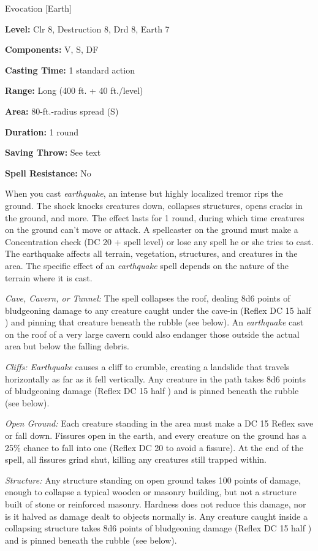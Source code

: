 
Evocation [Earth]

\textbf{Level:} Clr 8, Destruction 8, Drd 8, Earth 7

\textbf{Components:} V, S, DF

\textbf{Casting Time:} 1 standard action

\textbf{Range:} Long (400 ft. + 40 ft./level)

\textbf{Area:} 80-ft.-radius spread (S)

\textbf{Duration:} 1 round

\textbf{Saving Throw:} See text

\textbf{Spell Resistance:} No

When you cast \textit{earthquake}, an intense but highly localized tremor rips 
the ground. The shock knocks creatures down, collapses structures, opens cracks 
in the ground, and more. The effect lasts for 1 round, during which time creatures 
on the ground can't move or attack. A spellcaster on the ground must make a Concentration 
check (DC 20 + spell level) or lose any spell he or she tries to cast. The earthquake 
affects all terrain, vegetation, structures, and creatures in the area. The specific 
effect of an \textit{earthquake} spell depends on the nature of the terrain where 
it is cast.

\textit{Cave, Cavern, or Tunnel:} The spell collapses the roof, dealing 8d6 points 
of bludgeoning damage to any creature caught under the cave-in (Reflex DC 15 half 
) and pinning that creature beneath the rubble (see below). An \textit{earthquake 
}cast on the roof of a very large cavern could also endanger those outside the 
actual area but below the falling debris.

\textit{Cliffs: Earthquake} causes a cliff to crumble, creating a landslide that 
travels horizontally as far as it fell vertically. Any creature in the path takes 
8d6 points of bludgeoning damage (Reflex DC 15 half ) and is pinned beneath the 
rubble (see below).

\textit{Open Ground:} Each creature standing in the area must make a DC 15 Reflex 
save or fall down. Fissures open in the earth, and every creature on the ground 
has a 25\% chance to fall into one (Reflex DC 20 to avoid a fissure). At the end 
of the spell, all fissures grind shut, killing any creatures still trapped within.

\textit{Structure:} Any structure standing on open ground takes 100 points of damage, 
enough to collapse a typical wooden or masonry building, but not a structure built 
of stone or reinforced masonry. Hardness does not reduce this damage, nor is it 
halved as damage dealt to objects normally is. Any creature caught inside a collapsing 
structure takes 8d6 points of bludgeoning damage (Reflex DC 15 half ) and is pinned 
beneath the rubble (see below).

